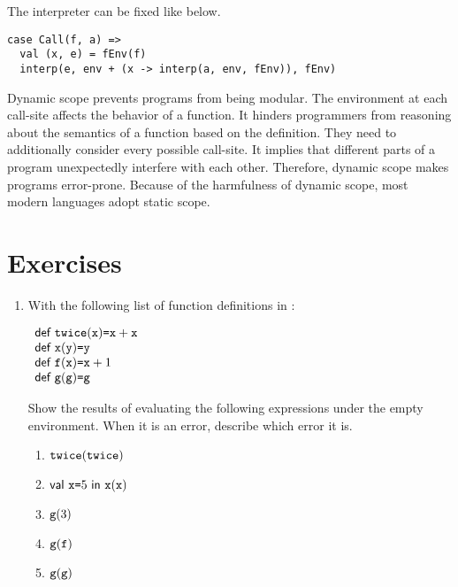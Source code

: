 The interpreter can be fixed like below.

\begin{verbatim}
case Call(f, a) =>
  val (x, e) = fEnv(f)
  interp(e, env + (x -> interp(a, env, fEnv)), fEnv)
\end{verbatim}

Dynamic scope prevents programs from being modular. The environment at each call-site
affects the behavior of a function. It hinders programmers from reasoning about
the semantics of a function based on the definition. They need to additionally consider
every possible call-site. It implies that different parts of a program unexpectedly
interfere with each other. Therefore, dynamic scope makes programs error-prone.
Because of the harmfulness of dynamic scope, most modern languages adopt static
scope.

\section{Exercises}

\begin{enumerate}
\item With the following list of function definitions in \lang:

$
\begin{array}{l}
  \textsf{def}\ \texttt{twice}(\texttt{x})\texttt{=}\texttt{x}+\texttt{x} \\
  \textsf{def}\ \texttt{x}(\texttt{y})\texttt{=}\texttt{y} \\
  \textsf{def}\ \texttt{f}(\texttt{x})\texttt{=}\texttt{x}+1 \\
  \textsf{def}\ \texttt{g}(\texttt{g})\texttt{=}\texttt{g} \\
\end{array}
$

Show the results of evaluating the following expressions under the empty environment.
When it is an error, describe which error it is.
\begin{enumerate}
  \item $\texttt{twice}(\texttt{twice})$
  \item $\textsf{val}\ \texttt{x}\texttt{=}5\ \textsf{in}\ \texttt{x}(\texttt{x})$
  \item $\texttt{g}(3)$
  \item $\texttt{g}(\texttt{f})$
  \item $\texttt{g}(\texttt{g})$
\end{enumerate}
\end{enumerate}
